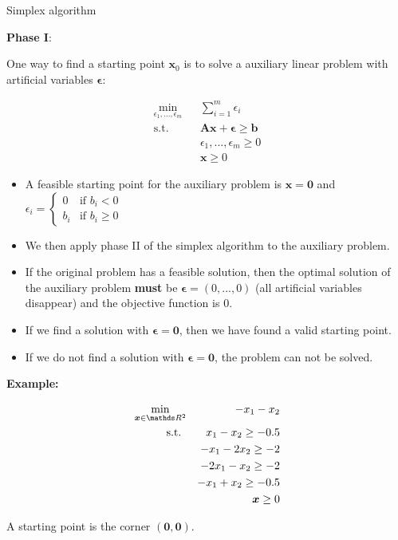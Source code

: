 \documentclass[11pt,compress,t,notes=noshow, xcolor=table]{beamer}
\begin{document}
\begin{vbframe}{Simplex algorithm}
\framebreak

\textbf{Phase I}:

One way to find a starting point $\bm{x}_0$ is to solve a auxiliary linear problem with artificial variables $\bm{\epsilon}$:

\begin{eqnarray*}
\min_{\epsilon_1, ..., \epsilon_m} && \sum_{i = 1}^m \epsilon_i \\
\text{s.t. } && \bm{Ax} + \bm{\epsilon} \ge \bm{b} \\
&& \epsilon_1, ..., \epsilon_m \ge 0\\
&& \bm{x} \ge 0
\end{eqnarray*}

\begin{itemize}
\item A feasible starting point for the auxiliary problem is $\bm{x} = \bm{0}$ and $\epsilon_i = \begin{cases} 0 & \text{if } b_i < 0 \\
b_i & \text{if } b_i \ge 0
\end{cases}$
\item We then apply phase II of the simplex algorithm to the auxiliary problem.
\item If the original problem has a feasible solution, then the optimal solution of the auxiliary problem \textbf{must} be $\bm{\epsilon} = (0, ..., 0)$ (all artificial variables disappear) and the objective function is $0$.
\item If we find a solution with $\bm{\epsilon} = \bm{0}$, then we have found a valid starting point.
\item If we do not find a solution with $\bm{\epsilon} = \bm{0}$, the problem can not be solved.
\end{itemize}

\framebreak

\textbf{Example:}

\begin{eqnarray*}
\min_{\bm{x} \in \R^2} && -x_1 - x_2 \\
\text{s.t. } && x_1 - x_2 \ge - 0.5 \\
&& - x_1 - 2 x_2 \ge - 2 \\
&& - 2x_1 - x_2 \ge - 2 \\
&& - x_1 + x_2 \ge - 0.5 \\
&& \bm{x} \ge 0
\end{eqnarray*}

A starting point is the corner $\bm{(0, 0)}$.


\end{vbframe}
\end{document}
